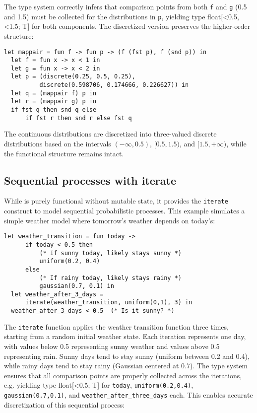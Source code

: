 \documentclass[acmsmall,screen,dvipsnames,x11names,nonacm,anonymous,review]{acmart}
\newcommand{\codetype}[1]{\textcolor{typecolor}{\ttfamily\small#1}}
\begin{document}
\noindent The type system correctly infers that comparison points from both \texttt{f} and \texttt{g} (0.5 and 1.5) must be collected for the distributions in \texttt{p}, yielding type \codetype{float[{<0.5,<1.5}; T]} for both components. The discretized version preserves the higher-order structure:

\begin{lstlisting}[aboveskip=1em,belowskip=1em]
  let mappair = fun f -> fun p -> (f (fst p), f (snd p)) in
  let f = fun x -> x < 1 in
  let g = fun x -> x < 2 in
  let p = (discrete(0.25, 0.5, 0.25), 
          discrete(0.598706, 0.174666, 0.226627)) in
  let q = (mappair f) p in
  let r = (mappair g) p in
  if fst q then snd q else 
      if fst r then snd r else fst q
\end{lstlisting}

\noindent The continuous distributions are discretized into three-valued discrete distributions based on the intervals $(-\infty, 0.5)$, $[0.5, 1.5)$, and $[1.5, +\infty)$, while the functional structure remains intact.

\subsection{Sequential processes with iterate}

While \Slice{} is purely functional without mutable state, it provides the \texttt{iterate} construct to model sequential probabilistic processes. This example simulates a simple weather model where tomorrow's weather depends on today's:

\begin{lstlisting}[aboveskip=1em,belowskip=1em,escapechar=!]
  let weather_transition = fun today ->
      if today < 0.5 then 
          (* If sunny today, likely stays sunny *)
          uniform(0.2, 0.4)
      else  
          (* If rainy today, likely stays rainy *)
          gaussian(0.7, 0.1) in
  let weather_after_3_days = 
      iterate(weather_transition, uniform(0,1), 3) in
  weather_after_3_days < 0.5  (* Is it sunny? *)
\end{lstlisting}

\noindent The \texttt{iterate} function applies the weather transition function three times, starting from a random initial weather state. Each iteration represents one day, with values below 0.5 representing sunny weather and values above 0.5 representing rain. Sunny days tend to stay sunny (uniform between 0.2 and 0.4), while rainy days tend to stay rainy (Gaussian centered at 0.7). The type system ensures that all comparison points are properly collected across the iterations, e.g. yielding type \codetype{float[<0.5; T]} for \texttt{today}, \texttt{uniform(0.2,0.4)}, \texttt{gaussian(0.7,0.1)}, and \texttt{weather\_after\_three\_days} each. This enables accurate discretization of this sequential process:
\end{document}
